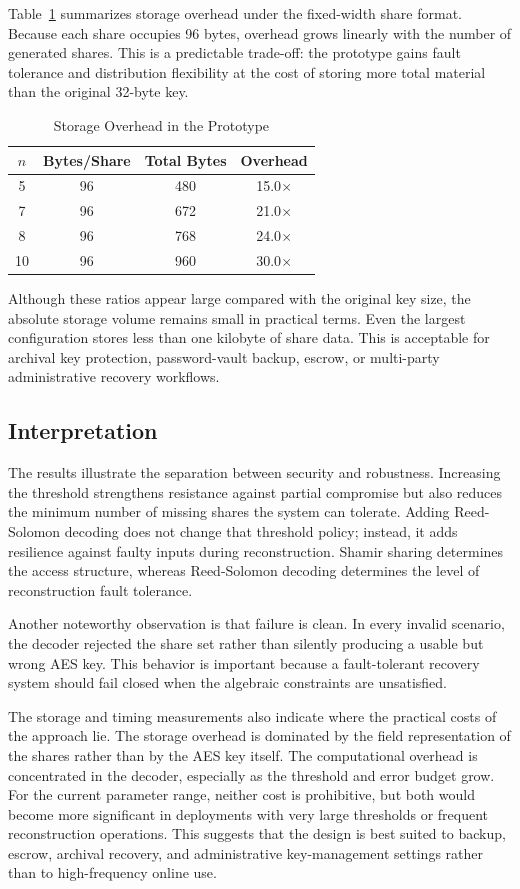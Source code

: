 Table~\ref{tab:storage} summarizes storage overhead under the fixed-width share format. Because each share occupies 96 bytes, overhead grows linearly with the number of generated shares. This is a predictable trade-off: the prototype gains fault tolerance and distribution flexibility at the cost of storing more total material than the original 32-byte key.

\begin{table}[H]
\caption{Storage Overhead in the Prototype}
\label{tab:storage}
\centering
\begin{tabular}{cccc}
\toprule
\textbf{$n$} & \textbf{Bytes/Share} & \textbf{Total Bytes} & \textbf{Overhead} \\
\midrule
5 & 96 & 480 & 15.0$\times$ \\
7 & 96 & 672 & 21.0$\times$ \\
8 & 96 & 768 & 24.0$\times$ \\
10 & 96 & 960 & 30.0$\times$ \\
\bottomrule
\end{tabular}
\end{table}

Although these ratios appear large compared with the original key size, the absolute storage volume remains small in practical terms. Even the largest configuration stores less than one kilobyte of share data. This is acceptable for archival key protection, password-vault backup, escrow, or multi-party administrative recovery workflows.

\subsection{Interpretation}

The results illustrate the separation between security and robustness. Increasing the threshold strengthens resistance against partial compromise but also reduces the minimum number of missing shares the system can tolerate. Adding Reed-Solomon decoding does not change that threshold policy; instead, it adds resilience against faulty inputs during reconstruction. Shamir sharing determines the access structure, whereas Reed-Solomon decoding determines the level of reconstruction fault tolerance.

Another noteworthy observation is that failure is clean. In every invalid scenario, the decoder rejected the share set rather than silently producing a usable but wrong AES key. This behavior is important because a fault-tolerant recovery system should fail closed when the algebraic constraints are unsatisfied.

The storage and timing measurements also indicate where the practical costs of the approach lie. The storage overhead is dominated by the field representation of the shares rather than by the AES key itself. The computational overhead is concentrated in the decoder, especially as the threshold and error budget grow. For the current parameter range, neither cost is prohibitive, but both would become more significant in deployments with very large thresholds or frequent reconstruction operations. This suggests that the design is best suited to backup, escrow, archival recovery, and administrative key-management settings rather than to high-frequency online use.
